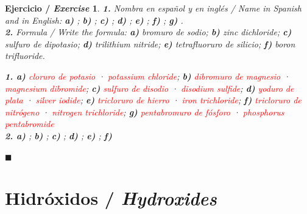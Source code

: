 \documentclass[12pt]{article}
\theoremstyle{mygreennumbox}
\newtheorem{ejercicioT}{Ejercicio / \textit{Exercise}}[section]
\newenvironment{exercise}{\begin{eBoxmygreen}\begin{ejercicioT}}{\hfill{\color{mygreen}\tiny\ensuremath{\blacksquare}}\end{ejercicioT}\end{eBoxmygreen}}
\newcommand{\en}[1]{\textit{#1}}
\begin{document}
\begin{exercise}
    \textbf{1.} Nombra en español y en inglés / \en{Name in Spanish and in English}: \textbf{a)} ; \textbf{b)} ; \textbf{c)} ; \textbf{d)} ; \textbf{e)} ; \textbf{f)} ; \textbf{g)} .\\
    \textbf{2.} Formula / \en{Write the formula}: \textbf{a)} bromuro de sodio; \textbf{b)} \en{zinc dichloride}; \textbf{c)} sulfuro de dipotasio; \textbf{d)} \en{trilithium nitride}; \textbf{e)} tetrafluoruro de silicio; \textbf{f)} \en{boron trifluoride}.
    \begin{solu}
        \textbf{1. a)} \textcolor{red}{cloruro de potasio} · \textcolor{red}{\en{potassium chloride}}; \textbf{b)} \textcolor{red}{dibromuro de magnesio} · \textcolor{red}{\en{magnesium dibromide}}; \textbf{c)} \textcolor{red}{sulfuro de disodio} · \textcolor{red}{\en{disodium sulfide}}; \textbf{d)} \textcolor{red}{yoduro de plata} · \textcolor{red}{\en{silver iodide}}; \textbf{e)} \textcolor{red}{tricloruro de hierro} · \textcolor{red}{\en{iron trichloride}}; \textbf{f)} \textcolor{red}{tricloruro de nitrógeno} · \textcolor{red}{\en{nitrogen trichloride}}; \textbf{g)} \textcolor{red}{pentabromuro de fósforo} · \textcolor{red}{\en{phosphorus pentabromide}}\\
        \textbf{2. a)} \textcolor{red}{}; \textbf{b)} \textcolor{red}{}; \textbf{c)} \textcolor{red}{}; \textbf{d)} \textcolor{red}{}; \textbf{e)} \textcolor{red}{}; \textbf{f)} \textcolor{red}{}
    \end{solu}
\end{exercise}

\section{Hidróxidos / \en{Hydroxides}}
\end{document}
